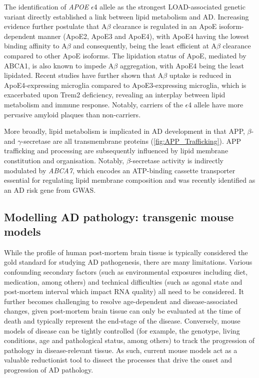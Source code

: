 The identification of \textit{APOE} $\epsilon$4 allele as the strongest LOAD-associated genetic variant directly established a link between lipid metabolism and AD. Increasing evidence further postulate that A$\beta$ clearance is regulated in an ApoE isoform-dependent manner (ApoE2, ApoE3 and ApoE4)\cite{Castellano2011}, with ApoE4 having the lowest binding affinity to A$\beta$ and consequently, being the least efficient at A$\beta$ clearance compared to other ApoE isoforms\cite{RM2012}. The lipidation status of ApoE, mediated by ABCA1\cite{R2010}, is also known to impede A$\beta$ aggregation, with ApoE4 being the least lipidated\cite{DM2006}. Recent studies have further shown that A$\beta$ uptake is reduced in ApoE4-expressing microglia compared to ApoE3-expressing microglia, which is exacerbated upon Trem2 deficiency, revealing an interplay between lipid metabolism and immune response\cite{Fitz2021}. Notably, carriers of the $\epsilon$4 allele have more pervasive amyloid plaques than non-carriers\cite{DE1993,E2009}.

More broadly, lipid metabolism is implicated in AD development in that APP, $\beta$- and $\gamma$-secretase are all transmembrane proteins (\cref{fig:APP_Trafficking}). APP trafficking and processing are subsequently influenced by lipid membrane constitution and organisation\cite{DiPaolo2011}. Notably, $\beta$-secretase activity is indirectly modulated by \textit{ABCA7}, which encodes an ATP-binding cassette transporter essential for regulating lipid membrane composition and was recently identified as an AD risk gene from GWAS\cite{Sierksma2020,Sakae2016}.  


\clearpage
\subsection{Modelling AD pathology: transgenic mouse models}
\label{ch1_mouse_model}
While the profile of human post-mortem brain tissue is typically considered the gold standard for studying AD pathogenesis, there are many limitations. Various confounding secondary factors (such as environmental exposures including diet, medication, among others) and technical difficulties (such as agonal state and post-mortem interval which impact RNA quality) all need to be considered. It further becomes challenging to resolve age-dependent and disease-associated changes, given post-mortem brain tissue can only be evaluated at the time of death and typically represent the end-stage of the disease. Conversely, mouse models of disease can be tightly controlled (for example, the genotype, living conditions, age and pathological status, among others) to track the progression of pathology in disease-relevant tissue. As such, current mouse models act as a valuable reductionist tool to dissect the processes that drive the onset and progression of AD pathology\cite{Hall2012}.

